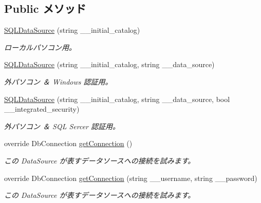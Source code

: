 \subsection*{Public メソッド}
\begin{DoxyCompactItemize}
\item 
\hyperlink{classlazurite_1_1relation_1_1sqlclient_1_1_s_q_l_data_source_afefa998139f6ea264cb0785270b4c3a0}{SQLDataSource} (string \_\-\_\-initial\_\-catalog)
\begin{DoxyCompactList}\small\item\em ローカルパソコン用。 \item\end{DoxyCompactList}\item 
\hyperlink{classlazurite_1_1relation_1_1sqlclient_1_1_s_q_l_data_source_ad431353000e4dd1934ceb96b2cca46b8}{SQLDataSource} (string \_\-\_\-initial\_\-catalog, string \_\-\_\-data\_\-source)
\begin{DoxyCompactList}\small\item\em 外パソコン ＆ Windows 認証用。 \item\end{DoxyCompactList}\item 
\hyperlink{classlazurite_1_1relation_1_1sqlclient_1_1_s_q_l_data_source_a9a0700de52851d929c639e774616cc9c}{SQLDataSource} (string \_\-\_\-initial\_\-catalog, string \_\-\_\-data\_\-source, bool \_\-\_\-integrated\_\-security)
\begin{DoxyCompactList}\small\item\em 外パソコン ＆ SQL Sercer 認証用。 \item\end{DoxyCompactList}\item 
override DbConnection \hyperlink{classlazurite_1_1relation_1_1sqlclient_1_1_s_q_l_data_source_a99a7bdaa7ca6fce82a89f537a72b2e23}{getConnection} ()
\begin{DoxyCompactList}\small\item\em この DataSource が表すデータソースへの接続を試みます。 \item\end{DoxyCompactList}\item 
override DbConnection \hyperlink{classlazurite_1_1relation_1_1sqlclient_1_1_s_q_l_data_source_a49e9bb60b11cb3d984257702a566e869}{getConnection} (string \_\-\_\-username, string \_\-\_\-password)
\begin{DoxyCompactList}\small\item\em この DataSource が表すデータソースへの接続を試みます。 \item\end{DoxyCompactList}\end{DoxyCompactItemize}
